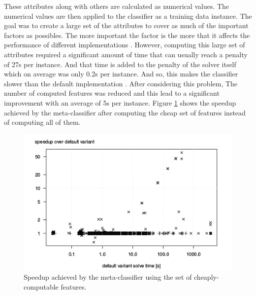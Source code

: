 These attributes along with others \cite{ml:csd} are calculated as numerical values. The numerical values are then applied to the classifier as a training data instance. The goal was to create a large set of the attributes to cover as much of the important factors as possibles. The more important the factor is the more that it affects the performance of different implementations \cite{ml:csd}. However, computing this large set of attributes required a significant amount of time that can usually reach a penalty of 27s per instance. And that time is added to the penalty of the solver itself which on average was only 0.2s per instance. And so, this makes the classifier slower than the default implementation \cite{ml:csd}. After considering this problem, The number of computed features was reduced and this lead to a significant improvement with an average of 5s per instance. Figure \ref{perf:speedup} shows the speedup achieved by the meta-classifier after computing the cheap set of features instead of computing all of them.
\\
\begin{figure}[h!]
  \vspace{1 cm}
  \includegraphics[width=1.0\textwidth]{images/speedup.png}
  \caption[ ]{Speedup achieved by the meta-classifier using the set of cheaply-computable
features.}
  \label{perf:speedup}
\end{figure}

